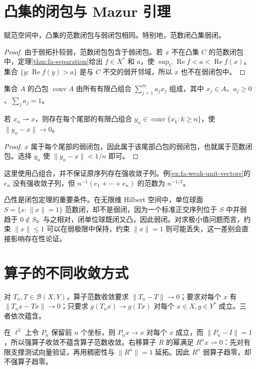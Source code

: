 \documentclass[UTF8,12pt,a4paper,fontset=fandol]{ctexbook}
\begin{document}
\section{凸集的闭包与 Mazur 引理}
\begin{theorem}\label{thm:fa-convex-weak-closure}
赋范空间中，凸集的范数闭包与弱闭包相同。特别地，范数闭凸集弱闭。
\end{theorem}
\begin{proof}
由于弱拓扑较弱，范数闭包包含于弱闭包。若 $x$ 不在凸集 $C$ 的范数闭包中，定理\ref{thm:fa-separation}给出 $f\in X^*$ 和 $a$，使 $\sup_C\operatorname{Re}f<a<\operatorname{Re}f(x)$。集合 $\{y:\operatorname{Re}f(y)>a\}$ 是与 $C$ 不交的弱开邻域，所以 $x$ 也不在弱闭包中。
\end{proof}
集合 $A$ 的凸包 $\operatorname{conv}A$ 由所有有限凸组合 $\sum_{j=1}^ma_jx_j$ 组成，其中 $x_j\in A$、$a_j\geq0$、$\sum_ja_j=1$。
\begin{corollary}[Mazur 引理]\label{cor:fa-mazur}
若 $x_n\rightharpoonup x$，则存在每个尾部的有限凸组合 $y_n\in\operatorname{conv}\{x_k:k\geq n\}$，使 $\|y_n-x\|\to0$。
\end{corollary}
\begin{proof}
$x$ 属于每个尾部的弱闭包，因此属于该尾部凸包的弱闭包，也就属于范数闭包。选择 $y_n$ 使 $\|y_n-x\|<1/n$ 即可。
\end{proof}
这里使用凸组合，并不保证原序列存在强收敛子列。例\ref{ex:fa-weak-unit-vectors}的 $e_n$ 没有强收敛子列，但 $n^{-1}(e_1+\cdots+e_n)$ 的范数为 $n^{-1/2}$。

凸性是闭包定理的重要条件。在无限维 Hilbert 空间中，单位球面 $S=\{x:\|x\|=1\}$ 范数闭，却不是弱闭，因为一个标准正交序列位于 $S$ 中并弱趋于 $0\notin S$。与之相对，闭单位球既闭又凸，因此弱闭。对求极小值问题而言，约束 $\|x\|\leq1$ 可以在弱极限中保持，约束 $\|x\|=1$ 则可能丢失，这一差别会直接影响存在性论证。

\section{算子的不同收敛方式}
对 $T_n,T\in\mathcal B(X,Y)$，算子范数收敛要求 $\|T_n-T\|\to0$；要求对每个 $x$ 有 $\|T_nx-Tx\|\to0$；只要求 $g(T_nx)\to g(Tx)$ 对每个 $x\in X,g\in Y^*$ 成立。三者依次蕴含。

在 $\ell^2$ 上令 $P_n$ 保留前 $n$ 个坐标，则 $P_nx\to x$ 对每个 $x$ 成立，而 $\|P_n-I\|=1$，所以强算子收敛不蕴含算子范数收敛。右移算子 $R$ 的幂满足 $R^nx\rightharpoonup0$：先对有限支撑测试向量验证，再用稠密性与 $\|R^n\|=1$ 延拓。因此 $R^n$ 弱算子趋零，却不强算子趋零。
\end{document}
